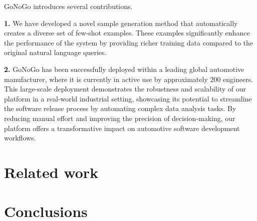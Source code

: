 \vspace{2cm}
GoNoGo introduces several contributions. 

\textbf{1.} We have developed a novel sample generation method that automatically creates a diverse set of few-shot examples. These examples significantly enhance the performance of the system by providing richer training data compared to the original natural language queries. 

\textbf{2.} GoNoGo has been successfully deployed within a leading global automotive manufacturer, where it is currently in active use by approximately 200 engineers. This large-scale deployment demonstrates the robustness and scalability of our platform in a real-world industrial setting, showcasing its potential to streamline the software release process by automating complex data analysis tasks. By reducing manual effort and improving the precision of decision-making, our platform offers a transformative impact on automotive software development workflows.



\section{Related work}
\cite{openai2023structuredoutputs}
\section{Conclusions}
